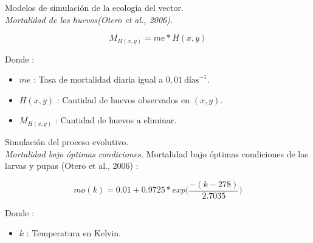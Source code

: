 {
\begin{frame}[c]{Modelos de simulación de la ecología del vector.\\\textit{Mortalidad de los huevos(Otero et al., 2006).}}
  \begin{center}
      \begin{equation}
          M_{H(x,y)} = me * H(x,y)
      \end{equation}
  \end{center}
  Donde :
    \begin{itemize}
      \item $me$ : Tasa de mortalidad diaria igual a $0,01\  \text{días}^{-1}$.
      \item $H(x, y)$ : Cantidad de huevos observados en $(x,y)$.
      \item $M_{H(x,y)}$ : Cantidad de huevos a eliminar.
    \end{itemize}
\end{frame}
}

\begin{frame}[c]{Simulación del proceso evolutivo. \\\textit{Mortalidad bajo óptimas condiciones.}}
  Mortalidad bajo óptimas condiciones de las larvas y pupas (Otero et al., 2006) :
  \begin{center}
    \begin{equation}
    \label{eq:mortalidad-natural-larvas}
        mo(k) = 0.01 + 0.9725 * exp\bigg( \frac{-(k - 278)}{2.7035}\bigg)
    \end{equation}
  \end{center}
  Donde :
    \begin{itemize}
      \item $k$ : Temperatura en Kelvin.
    \end{itemize}
\end{frame}

